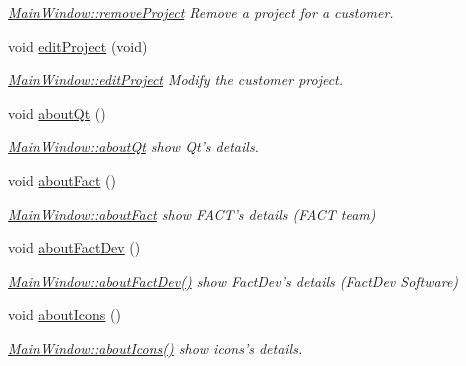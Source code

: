 \begin{DoxyCompactItemize}
\begin{DoxyCompactList}\small\item\em \hyperlink{classMainWindow_acac126b5b24ba9027f6a0052aec10baf}{Main\+Window\+::remove\+Project} Remove a project for a customer. \end{DoxyCompactList}\item 
\hypertarget{classMainWindow_a9841d0d3f02715dbc3cfda9ad6b107ca}{void \hyperlink{classMainWindow_a9841d0d3f02715dbc3cfda9ad6b107ca}{edit\+Project} (void)}\label{classMainWindow_a9841d0d3f02715dbc3cfda9ad6b107ca}

\begin{DoxyCompactList}\small\item\em \hyperlink{classMainWindow_a9841d0d3f02715dbc3cfda9ad6b107ca}{Main\+Window\+::edit\+Project} Modify the customer project. \end{DoxyCompactList}\item 
\hypertarget{classMainWindow_a4710d90108bd39f7b80bdc6c3a1b1aef}{void \hyperlink{classMainWindow_a4710d90108bd39f7b80bdc6c3a1b1aef}{about\+Qt} ()}\label{classMainWindow_a4710d90108bd39f7b80bdc6c3a1b1aef}

\begin{DoxyCompactList}\small\item\em \hyperlink{classMainWindow_a4710d90108bd39f7b80bdc6c3a1b1aef}{Main\+Window\+::about\+Qt} show Qt's details. \end{DoxyCompactList}\item 
\hypertarget{classMainWindow_a82e1b6ba63283af94f37684cf14b5c66}{void \hyperlink{classMainWindow_a82e1b6ba63283af94f37684cf14b5c66}{about\+Fact} ()}\label{classMainWindow_a82e1b6ba63283af94f37684cf14b5c66}

\begin{DoxyCompactList}\small\item\em \hyperlink{classMainWindow_a82e1b6ba63283af94f37684cf14b5c66}{Main\+Window\+::about\+Fact} show F\+A\+C\+T's details (F\+A\+C\+T team) \end{DoxyCompactList}\item 
\hypertarget{classMainWindow_af9af9644d45d2af769d18f2370eed83e}{void \hyperlink{classMainWindow_af9af9644d45d2af769d18f2370eed83e}{about\+Fact\+Dev} ()}\label{classMainWindow_af9af9644d45d2af769d18f2370eed83e}

\begin{DoxyCompactList}\small\item\em \hyperlink{classMainWindow_af9af9644d45d2af769d18f2370eed83e}{Main\+Window\+::about\+Fact\+Dev()} show Fact\+Dev's details (Fact\+Dev Software) \end{DoxyCompactList}\item 
\hypertarget{classMainWindow_ae6a7598b9931ca8901a62bb95c490e0e}{void \hyperlink{classMainWindow_ae6a7598b9931ca8901a62bb95c490e0e}{about\+Icons} ()}\label{classMainWindow_ae6a7598b9931ca8901a62bb95c490e0e}

\begin{DoxyCompactList}\small\item\em \hyperlink{classMainWindow_ae6a7598b9931ca8901a62bb95c490e0e}{Main\+Window\+::about\+Icons()} show icons's details. \end{DoxyCompactList}\end{DoxyCompactItemize}
